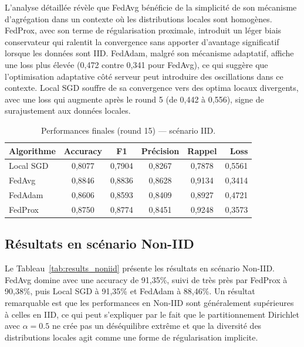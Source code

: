 \documentclass[12pt,a4paper]{report}
\begin{document}
L'analyse d\'{e}taill\'{e}e r\'{e}v\`{e}le que FedAvg b\'{e}n\'{e}ficie de la simplicit\'{e} de son m\'{e}canisme d'agr\'{e}gation dans un contexte o\`{u} les distributions locales sont homog\`{e}nes. FedProx, avec son terme de r\'{e}gularisation proximale, introduit un l\'{e}ger biais conservateur qui ralentit la convergence sans apporter d'avantage significatif lorsque les donn\'{e}es sont IID. FedAdam, malgr\'{e} son m\'{e}canisme adaptatif, affiche une loss plus \'{e}lev\'{e}e (0,472 contre 0,341 pour FedAvg), ce qui sugg\`{e}re que l'optimisation adaptative c\^{o}t\'{e} serveur peut introduire des oscillations dans ce contexte. Local SGD souffre de sa convergence vers des optima locaux divergents, avec une loss qui augmente apr\`{e}s le round 5 (de 0,442 \`{a} 0,556), signe de surajustement aux donn\'{e}es locales.

\begin{table}[H]
\centering
\caption{Performances finales (round 15) --- sc\'{e}nario IID.}
\label{tab:results_iid}
\begin{tabular}{lccccr}
\toprule
\textbf{Algorithme} & \textbf{Accuracy} & \textbf{F1} & \textbf{Pr\'{e}cision} & \textbf{Rappel} & \textbf{Loss} \\
\midrule
Local SGD & 0,8077 & 0,7904 & 0,8267 & 0,7878 & 0,5561 \\
FedAvg    & 0,8846 & 0,8836 & 0,8628 & 0,9134 & 0,3414 \\
FedAdam   & 0,8606 & 0,8593 & 0,8409 & 0,8927 & 0,4721 \\
FedProx   & 0,8750 & 0,8774 & 0,8451 & 0,9248 & 0,3573 \\
\bottomrule
\end{tabular}
\end{table}

\subsection{R\'{e}sultats en sc\'{e}nario Non-IID}

Le Tableau~\ref{tab:results_noniid} pr\'{e}sente les r\'{e}sultats en sc\'{e}nario Non-IID. FedAvg domine avec une accuracy de 91,35\%, suivi de tr\`{e}s pr\`{e}s par FedProx \`{a} 90,38\%, puis Local SGD \`{a} 91,35\% et FedAdam \`{a} 88,46\%. Un r\'{e}sultat remarquable est que les performances en Non-IID sont g\'{e}n\'{e}ralement sup\'{e}rieures \`{a} celles en IID, ce qui peut s'expliquer par le fait que le partitionnement Dirichlet avec $\alpha = 0.5$ ne cr\'{e}e pas un d\'{e}s\'{e}quilibre extr\^{e}me et que la diversit\'{e} des distributions locales agit comme une forme de r\'{e}gularisation implicite.
\end{document}
